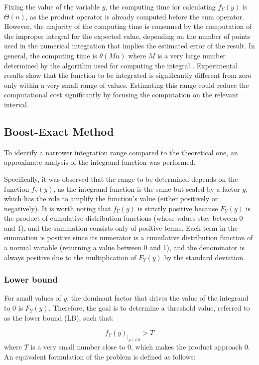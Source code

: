Fixing the value of the variable $y$, the computing time for calculating $f_Y(y)$ is $\Theta(n)$, as the product operator is already computed before the sum operator. However, the majority of the computing time is consumed by the computation of the improper integral for the expected value, depending on the number of points used in the numerical integration that implies the estimated error of the result. In general, the computing time is $\theta(M n)$ where $M$ is a very large number determined by the algorithm used for computing the integral \cite{2020SciPy-NMeth}.
Experimental results show that the function to be integrated is significantly different from zero only within a very small range of values. Estimating this range could reduce the computational cost significantly by focusing the computation on the relevant interval.



\subsection{Boost-Exact Method}
To identify a narrower integration range compared to the theoretical one, an approximate analysis of the integrand function was performed.

Specifically, it was observed that the range to be determined depends on the function \( f_Y(y) \), as the integrand function is the same but scaled by a factor \( y \), which has the role to amplify the function's value (either positively or negatively). It is worth noting that \( f_Y(y) \) is strictly positive because \( F_Y(y) \) is the product of cumulative distribution functions (whose values stay between 0 and 1), and the summation consists only of positive terms. Each term in the summation is positive since its numerator is a cumulative distribution function of a normal variable (returning a value between 0 and 1), and the denominator is always positive due to the multiplication of \( F_Y(y) \) by the standard deviation.



\subsubsection{Lower bound}
For small values of \( y \), the dominant factor that drives the value of the integrand to 0 is \( F_Y(y) \). Therefore, the goal is to determine a threshold value, referred to as the lower bound (LB), such that:

$$f_Y(y)_{|_{y = LB}} > T $$
where \( T \) is a very small number close to 0, which makes the product approach 0. An equivalent formulation of the problem is defined as follows:

